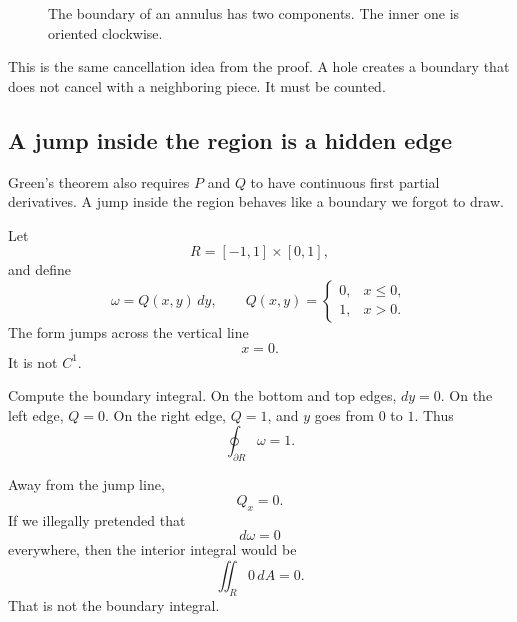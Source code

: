 \begin{figure}[h]
\centering
{}
\caption{The boundary of an annulus has two components.  The inner one is oriented
clockwise.}
\end{figure}

This is the same cancellation idea from the proof.  A hole creates a boundary that does
not cancel with a neighboring piece.  It must be counted.

\subsection{A jump inside the region is a hidden edge}

Green's theorem also requires \(P\) and \(Q\) to have continuous first partial
derivatives.  A jump inside the region behaves like a boundary we forgot to draw.

Let
\[
    R=[-1,1]\times[0,1],
\]
and define
\[
    \omega=Q(x,y)\,dy,
    \qquad
    Q(x,y)=
    \begin{cases}
    0, & x\le0,\\
    1, & x>0.
    \end{cases}
\]
The form jumps across the vertical line
\[
    x=0.
\]
It is not \(C^1\).

Compute the boundary integral.  On the bottom and top edges, \(dy=0\).  On the left
edge, \(Q=0\).  On the right edge, \(Q=1\), and \(y\) goes from \(0\) to \(1\).  Thus
\[
\boxed{
    \oint_{\partial R}\omega=1.
}
\]

Away from the jump line,
\[
    Q_x=0.
\]
If we illegally pretended that
\[
    d\omega=0
\]
everywhere, then the interior integral would be
\[
    \iint_R 0\,dA=0.
\]
That is not the boundary integral.

